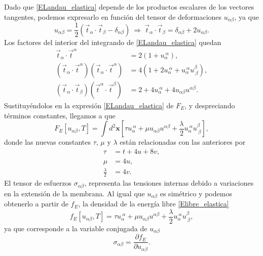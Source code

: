 Dado que \eqref{ELandau_elastica} depende de los productos escalares de los
vectores tangentes, podemos expresarlo en función del tensor de deformaciones
$u_{\alpha\beta}$, ya que
\begin{equation*}
u_{\alpha\beta}=\frac{1}{2}(\vec{t}_{\alpha}\cdot\vec{t}_{\beta}-\delta_{\alpha\beta})\
\Rightarrow \
\vec{t}_{\alpha}\cdot\vec{t}_{\beta}=\delta_{\alpha\beta}+2u_{\alpha\beta}.
\end{equation*}
Los factores del interior del integrando de \eqref{ELandau_elastica} quedan
\begin{align*}
\vec{t}_{\alpha}\cdot\vec{t}^{\alpha} &=2(1+u_{\alpha}^{\ \alpha}),\\
(\vec{t}_{\alpha}\cdot\vec{t}^{\alpha})(\vec{t}_{\alpha}\cdot\vec{t}^{\alpha})&=4(1+2u_{\alpha}^{\
  \alpha}+u_{\alpha}^{\ \alpha}u^{\beta}_{\ \beta}),\\
(\vec{t}_{\alpha}\cdot\vec{t}_{\beta})(\vec{t}^{\alpha}\cdot\vec{t}^{\beta})&=2+4u_{\alpha}^{\
  \alpha}+4u_{\alpha\beta}u^{\alpha\beta}.
\end{align*}
Sustituyéndolos en la expresión \eqref{ELandau_elastica} de $F_E$, y
despreciando términos constantes, llegamos a que \cite{Bowick:Libro_superficies}
\begin{equation}\label{Elibre_elastica}
F_E[u_{\alpha\beta},T]=\int d^2\mathbf{x}
\left[\tau u_{\alpha}^{\ \alpha}+
\mu u_{\alpha\beta}u^{\alpha\beta} +
\frac{\lambda}{2}u_{\alpha}^{\ \alpha}u^{\beta}_{\ \beta}\right],
\end{equation}
donde las nuevas constantes $\tau$, $\mu$ y $\lambda$ están relacionadas con
las anteriores por
\begin{align}
\tau&=t+4u+8v,\label{tau}\\
\mu&=4u,\\
\frac{\lambda}{2}&=4v.
\end{align}
El tensor de esfuerzos $\sigma_{\alpha\beta}$, representa las tensiones
internas debido a variaciones en la extensión de la membrana. Al igual que
$u_{\alpha\beta}$ es simétrico y podemos obtenerlo a partir de $f_E$, la densidad de
la energía libre \eqref{Elibre_elastica}
\begin{equation*}
f_E[u_{\alpha\beta},T]=\tau u_{\alpha}^{\ \alpha}+
\mu u_{\alpha\beta}u^{\alpha\beta} +
\frac{\lambda}{2}u_{\alpha}^{\ \alpha}u^{\beta}_{\ \beta},
\end{equation*}
ya que corresponde a la variable conjugada de $u_{\alpha\beta}$
\begin{equation}\label{tensor_esfuerzos}
\sigma_{\alpha\beta}=\frac{\partial f_E}{ \partial u_{\alpha\beta}}.
\end{equation}
